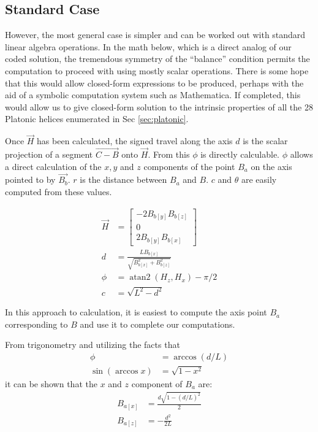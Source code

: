 \documentclass[11pt]{article}
\DeclareMathOperator{\atantwo}{atan2}
\begin{document}
{\subsection{Standard Case}

However, the most general case is simpler and can be worked
out with standard linear algebra operations. In the math below,
which is a direct analog of our coded solution, the tremendous symmetry of the ``balance'' condition
permits the computation to proceed with
using mostly scalar operations. There is some hope that
this would allow closed-form expressions to be produced, perhaps
with the aid of a symbolic computation system such as
Mathematica\cite{Mathematica}. If completed, this would
allow us to give closed-form solution to the intrinsic properties
of all the 28 Platonic helices enumerated in Sec \ref{sec:platonic}.

Once $\overrightarrow{H}$ has been calculated, the signed travel along the axis $d$ is
the scalar projection of a segment $\overrightarrow{C - B}$ onto $\overrightarrow{H}$.
From this $\phi$ is directly calculable. $\phi$ allows
a direct calculation of the $x,y$ and $z$ components of the
point $B_a$ on the axis pointed to by $\overrightarrow{B_b}$.
$r$ is the distance between $B_a$ and $B$. $c$ and $\theta$
are easily computed from these values.

\begin{align}
  \overrightarrow{H} &=  \begin{bmatrix} -2 B_{b[y]} B_{b[z]} \\ 0 \\ 2 B_{b[y]} B_{b[x]}  \end{bmatrix} \\
  d &= \frac{L B_{b[x]}}{\sqrt{B_{b[x]}^2 + B_{b[z]}^2}}  \\
  \phi &= \atantwo{(H_z,H_x)} - \pi/2  \\
  c &= \sqrt{L^2 - d^2}
\end{align}

In this approach to calculation, it is easiest
to compute the axis point $B_a$ corresponding to $B$ and
use it to complete our computations.

From trigonometry and utilizing the facts that
\begin{align}
\phi &= \arccos{(d/L)} \\
\sin{(\arccos{x})} &= \sqrt{1 - x^2}
\end{align}
  it
can be shown that
the $x$ and $z$ component of $B_a$ are:
\begin{align}
  B_{a[x]} &= \frac{d\sqrt{1 - (d/L)^2}}{2} \\
  B_{a[z]} &= -\frac{d^2}{2L}
\end{align}

}
\end{document}
